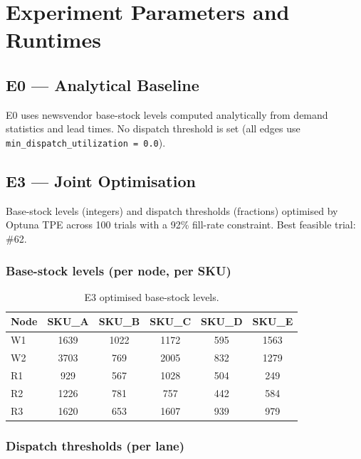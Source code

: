 \chapter{Experiment Parameters and Runtimes}
\label{appn:params}

\section*{E0 --- Analytical Baseline}

E0 uses newsvendor base-stock levels computed analytically from demand
statistics and lead times.  No dispatch threshold is set (all edges use
\texttt{min\_dispatch\_utilization = 0.0}).

\section*{E3 --- Joint Optimisation}

Base-stock levels (integers) and dispatch thresholds (fractions)
optimised by Optuna TPE across 100 trials with a 92\% fill-rate
constraint.  Best feasible trial: \#62.

\subsection*{Base-stock levels (per node, per SKU)}

\begin{table}[H]
  \centering
  \caption{E3 optimised base-stock levels.}
  \begin{tabular}{@{}lccccc@{}}
    \toprule
    Node & SKU\_A & SKU\_B & SKU\_C & SKU\_D & SKU\_E \\
    \midrule
    W1 & 1639 & 1022 & 1172 &  595 & 1563 \\
    W2 & 3703 &  769 & 2005 &  832 & 1279 \\
    R1 &  929 &  567 & 1028 &  504 &  249 \\
    R2 & 1226 &  781 &  757 &  442 &  584 \\
    R3 & 1620 &  653 & 1607 &  939 &  979 \\
    \bottomrule
  \end{tabular}
\end{table}
\vspace{-1em}
\subsection*{Dispatch thresholds (per lane)}


